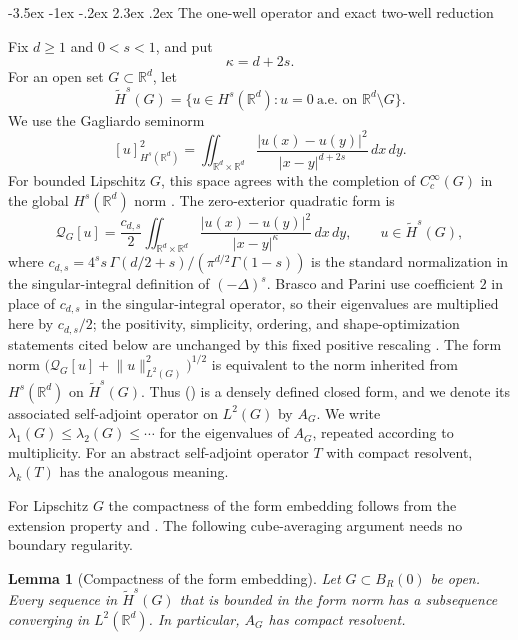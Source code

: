 \documentclass[twoside,10pt]{article}
\makeatletter
\numberwithin{equation}{section}
\theoremstyle{slbody}
\newtheorem{lemma}[theorem]{Lemma}
\theoremstyle{definition}
\newcommand{\R}{\mathbb{R}}
\newcommand{\Hs}{\widetilde H^s}
\newcommand{\norm}[1]{\lVert #1\rVert}
\newcommand{\abs}[1]{\lvert #1\rvert}
\renewcommand{\section}{%
  \@startsection{section}{1}{\z@}%
    {-3.5ex \@plus -1ex \@minus -.2ex}%
    {2.3ex \@plus .2ex}%
    {\normalfont\large\bfseries}}
\renewcommand{\eqref}[1]{%
  \textup{{\normalfont(\oldstylenums{\ref{#1}}}\normalfont)}}
\makeatother
\begin{document}
\section{The one-well operator and exact two-well reduction}

Fix $d\geq1$ and $0<s<1$, and put
\[
 \kappa=d+2s.
\]
For an open set $G\subset\R^d$, let
\[
 \Hs(G)=\{u\in H^s(\R^d):u=0\ \text{a.e. on }\R^d\setminus G\}.
\]
We use the Gagliardo seminorm
\[
 [u]_{H^s(\R^d)}^2
 =\iint_{\R^d\times\R^d}
   \frac{\abs{u(x)-u(y)}^2}{\abs{x-y}^{d+2s}}\,dx\,dy.
\]
For bounded Lipschitz $G$, this space agrees with the completion of
$C_c^\infty(G)$ in the global $H^s(\R^d)$ norm
\cite[Section~2, equation~(2.1)]{DjitteFallWeth2021}.
The zero-exterior quadratic form is
\begin{equation}\label{eq:form}
 \mathcal{Q}_G[u]
 =\frac{c_{d,s}}2\iint_{\R^d\times\R^d}
   \frac{\abs{u(x)-u(y)}^2}{\abs{x-y}^{\kappa}}\,dx\,dy,
 \qquad u\in\Hs(G),
\end{equation}
where
$c_{d,s}=4^s s\,\Gamma(d/2+s)/(\pi^{d/2}\Gamma(1-s))$
is the standard normalization in the singular-integral definition of
$(-\Delta)^s$.  Brasco and Parini use coefficient $2$ in place of
$c_{d,s}$ in the singular-integral operator, so their eigenvalues are
multiplied here by $c_{d,s}/2$; the positivity, simplicity, ordering, and
shape-optimization statements cited below are unchanged by this fixed
positive rescaling
\cite[arXiv v2, Section~1.1, p.~2]{BrascoParini2016}.  The form norm
$\bigl(\mathcal{Q}_G[u]+\norm{u}_{L^2(G)}^2\bigr)^{1/2}$
is equivalent to the norm inherited from $H^s(\R^d)$ on $\Hs(G)$.  Thus
\eqref{eq:form} is a densely defined closed form, and we denote its associated
self-adjoint operator on $L^2(G)$ by $A_G$.
We write
$\lambda_1(G)\leq\lambda_2(G)\leq\cdots$ for the eigenvalues of $A_G$,
repeated according to multiplicity.  For an abstract self-adjoint operator
$T$ with compact resolvent, $\lambda_k(T)$ has the analogous meaning.

For Lipschitz $G$ the compactness of the form embedding follows from the
extension property and
\cite[Theorems~5.4 and~7.1]{DiNezzaPalatucciValdinoci2012}.  The following
cube-averaging argument needs no boundary regularity.

\begin{lemma}[Compactness of the form embedding]\label{lem:compact}
Let $G\subset B_R(0)$ be open.  Every sequence in $\Hs(G)$ that is bounded in
the form norm has a subsequence converging in $L^2(\R^d)$.  In particular,
$A_G$ has compact resolvent.
\end{lemma}
\end{document}
